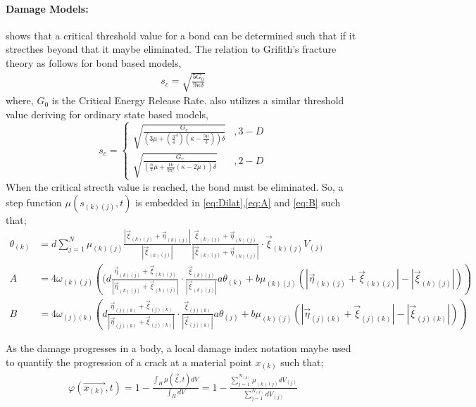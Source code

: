 \documentclass[10pt,a4paper,onecolumn]{article}
\begin{document}
\paragraph{Damage Models:}
\cite{SILLING20051526} shows that a critical threshold value for a bond can be determined such that if it strecthes beyond that it maybe eliminated. The relation to Grifith's fracture theory as follows for bond based models, 
\begin{align}
s_c = \sqrt{\frac{5G_0}{9\kappa\delta}}
\end{align}
where, $G_0$ is the Critical Energy Release Rate. 
\cite{MADENCI_OTERKUS} also utilizes a similar threshold value deriving for ordinary state based models, 
\[
s_c=
\begin{cases}
\sqrt{\frac{G_c}{(3\mu+(\frac{3}{4}^4)(\kappa-\frac{5\mu}{3}))\delta}}&, 3-D\\
\sqrt{\frac{G_c}{(\frac{6}{\pi}\mu + \frac{16}{9\pi^2}(\kappa-2\mu))\delta}}&, 2-D
\end{cases}
\]
When the critical strecth value is reached, the bond must be eliminated. So, a step function $\mu(s_{(k)(j)},t)$ is embedded in \ref{eq:Dilat},\ref{eq:A} and \ref{eq:B} such that; 
\begin{align}
\theta_{(k)} &= d \sum_{j=1}^{N} \mu_{(k)(j)} \frac{|\vec{\xi}_{(k)(j)}+\vec{\eta}_{(k)(j)}|}{|\vec{\xi}_{(k)(j)}|}\frac{\vec{\xi}_{(k)(j)}+\vec{\eta}_{(k)(j)}}{|\vec{\xi}_{(k)(j)}+\vec{\eta}_{(k)(j)}|}\cdot\vec{\xi}_{(k)(j)}V_{(j)}\\
A &= 4\omega_{(k)(j)}\left((d \frac{\vec{\eta}_{(k)(j)}+\vec{\xi}_{(k)(j)}}{|\vec{\eta}_{(k)(j)}+\vec{\xi}_{(k)(j)}|}\cdot\frac{\vec{\xi}_{(k)(j)}}{|\vec{\xi}_{(k)(j)}|}a\theta_{(k)}+ b \mu_{(k)(j)}\left( |\vec{\eta}_{(k)(j)}+\vec{\xi}_{(k)(j)}|-|\vec{\xi}_{(k)(j)}|\right)\right)\\
B &= 4\omega_{(j)(k)}\left(d \frac{\vec{\eta}_{(j)(k)}+\vec{\xi}_{(j)(k)}}{|\vec{\eta}_{(j)(k)}+\vec{\xi}_{(j)(k)}|}\cdot\frac{\vec{\xi}_{(j)(k)}}{|\vec{\xi}_{(j)(k)}|}a\theta_{(j)}+ b \mu_{(k)(j)}\left( |\vec{\eta}_{(j)(k)}+\vec{\xi}_{(j)(k)}|-|\vec{\xi}_{(j)(k)}|\right)\right)
\end{align}

As the damage progresses in a body, a local damage index notation maybe used to quantify the progression of a crack at a material point $x_{(k)}$ such that; 
\begin{align}
\varphi(\vec{x_{(k)}},t) = 1 - \frac{\int_{H}\mu(\vec{\xi},t)dV}{\int_{H}dV} = 1 - \frac{\sum_{j=1}^{N_{(k)}}\mu_{(k)(j)}dV_{(j)}}{\sum_{j=1}^{N_{(k)}}dV_{(j)}} 
\end{align}
\end{document}

